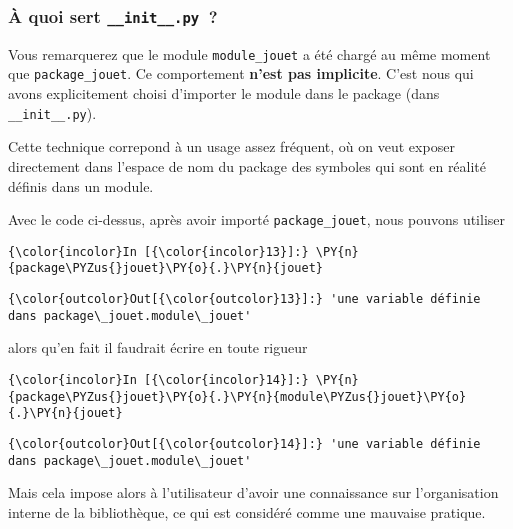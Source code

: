     \hypertarget{uxe0-quoi-sert-__init__.py}{%
\subsubsection{\texorpdfstring{À quoi sert
\texttt{\_\_init\_\_.py}~?}{À quoi sert \_\_init\_\_.py~?}}\label{uxe0-quoi-sert-__init__.py}}

    Vous remarquerez que le module \texttt{module\_jouet} a été chargé au
même moment que \texttt{package\_jouet}. Ce comportement \textbf{n'est
pas implicite}. C'est nous qui avons explicitement choisi d'importer le
module dans le package (dans \texttt{\_\_init\_\_.py}).

    Cette technique correpond à un usage assez fréquent, où on veut exposer
directement dans l'espace de nom du package des symboles qui sont en
réalité définis dans un module.

Avec le code ci-dessus, après avoir importé \texttt{package\_jouet},
nous pouvons utiliser

    \begin{Verbatim}[commandchars=\\\{\}]
{\color{incolor}In [{\color{incolor}13}]:} \PY{n}{package\PYZus{}jouet}\PY{o}{.}\PY{n}{jouet}
\end{Verbatim}


\begin{Verbatim}[commandchars=\\\{\}]
{\color{outcolor}Out[{\color{outcolor}13}]:} 'une variable définie dans package\_jouet.module\_jouet'
\end{Verbatim}
            
    alors qu'en fait il faudrait écrire en toute rigueur

    \begin{Verbatim}[commandchars=\\\{\}]
{\color{incolor}In [{\color{incolor}14}]:} \PY{n}{package\PYZus{}jouet}\PY{o}{.}\PY{n}{module\PYZus{}jouet}\PY{o}{.}\PY{n}{jouet}
\end{Verbatim}


\begin{Verbatim}[commandchars=\\\{\}]
{\color{outcolor}Out[{\color{outcolor}14}]:} 'une variable définie dans package\_jouet.module\_jouet'
\end{Verbatim}
            
    Mais cela impose alors à l'utilisateur d'avoir une connaissance sur
l'organisation interne de la bibliothèque, ce qui est considéré comme
une mauvaise pratique.

